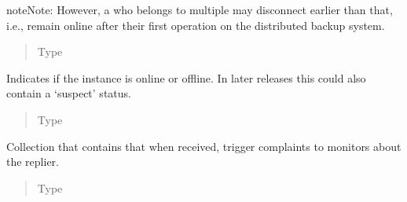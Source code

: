 \documentclass[letterpaper,10pt,english]{sphinxmanual}
\begin{document}
\begin{fulllineitems}
\begin{fulllineitems}
\begin{sphinxadmonition}{note}{Note:}
However, a  who belongs to multiple
{\hyperref[\detokenize{app.domain:app.domain.cluster_groups.Cluster}]{}}
may disconnect earlier than that, i.e.,
 remain online  after
their first operation on the distributed backup system.
\end{sphinxadmonition}
\begin{quote}\begin{description}
\item[{Type}] \leavevmode
{}

\end{description}\end{quote}

\end{fulllineitems}


\begin{fulllineitems}
\label{\detokenize{app.domain:app.domain.network_nodes.Node.status}}
Indicates if the  instance is online or offline. In later
releases this could also contain a ‘suspect’ status.
\begin{quote}\begin{description}
\item[{Type}] \leavevmode
{\hyperref[\detokenize{app.domain.helpers:app.domain.helpers.enums.Status}]{}}

\end{description}\end{quote}

\end{fulllineitems}


\begin{fulllineitems}
\label{\detokenize{app.domain:app.domain.network_nodes.Node.suspicious_replies}}
Collection that contains
{\hyperref[\detokenize{app.domain.helpers:app.domain.helpers.enums.HttpCodes}]{}}
that when received, trigger complaints to monitors about the
replier.
\begin{quote}\begin{description}
\item[{Type}] \leavevmode
{}


\end{description}
\end{quote}
\end{fulllineitems}
\end{fulllineitems}
\end{document}
